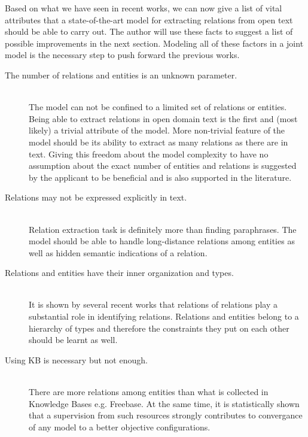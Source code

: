 \documentclass[12pt]{report}
\begin{document}
Based on what we have seen in recent works, we can now give a list of vital
attributes that a state-of-the-art model for extracting relations from open text
should be able to carry out. The author will use these facts to suggest a list of possible improvements
in the next section. Modeling all of
these factors in a joint model is the necessary step to push forward the previous
works.

\begin{description}
  
  \item[The number of relations and entities is an unknown parameter.] \hfill \\
  The model can not be confined to a limited set of relations or entities. Being able to extract relations in
  open domain text is the first and (most likely) a trivial attribute of the model. More non-trivial feature
  of the model should be its ability to extract as many relations as there are in text. 
  Giving this freedom
  about the model complexity to have no assumption about the exact number of entities and relations
  is suggested by the applicant to be beneficial 
   and is also supported in the literature.

  \item[Relations may not be expressed explicitly in text.] \hfill \\
  Relation extraction task is definitely more than finding paraphrases. The model should be able to handle
  long-distance relations among entities as well as hidden semantic indications of a relation.
  

  \item[Relations and entities have their inner organization and types.] \hfill \\
  It is shown by several recent works that relations of relations play a substantial role in identifying
  relations. Relations and entities belong to a hierarchy of types and therefore the constraints they put on each other
  should be learnt as well.

  \item[Using KB is necessary but not enough.] \hfill \\
  There are more relations among entities than what is collected in 
  Knowledge Bases e.g. Freebase. At the same time, it is statistically shown that a supervision
  from such resources strongly contributes to convergance of any model to a better 
  objective configurations.


\end{description}
\end{document}
